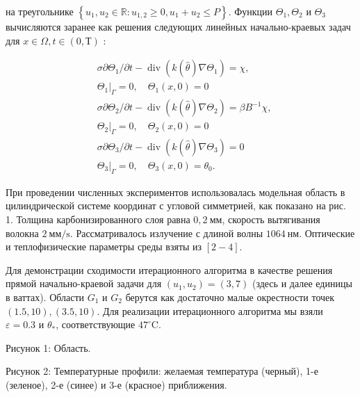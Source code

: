на треугольнике  $\left\{u_{1}, u_{2} \in \mathbb{R}: u_{1,2} \geq 0, u_{1}+u_{2} \leq P\right\}$.
Функции $\Theta_{1}, \Theta_{2}$ и $\Theta_{3}$ вычисляются заранее как решения следующих линейных
начально-краевых задач для $x \in \Omega, t \in(0 , Т)$ :


\[
    \begin{aligned}
        &\sigma \partial \Theta_{1} / \partial t-\operatorname{div}\left(k(\widehat{\theta})
        \nabla \Theta_{1}\right)=\chi, \\
        &\left.\Theta_{1}\right|_{\Gamma}=0, \quad \Theta_{1}(x, 0)=0 \\
        &\sigma \partial \Theta_{2} / \partial t-\operatorname{div}\left(k(\widehat{\theta})
        \nabla \Theta_{2}\right)=\beta B^{-1} \chi, \\
        &\left.\Theta_{2}\right|_{\Gamma}=0, \quad \Theta_{2}(x, 0)=0 \\
        &\sigma \partial \Theta_{3} / \partial t-\operatorname{div}\left(k(\widehat{\theta})
        \nabla \Theta_{3}\right)=0 \\
        &\left.\Theta_{3}\right|_{\Gamma}=0, \quad \Theta_{3}(x, 0)=\theta_{0} .
    \end{aligned}
\]

При проведении численных экспериментов использовалась модельная область в
цилиндрической системе координат с угловой симметрией, как показано на рис. 1.
Толщина карбонизированного слоя равна
$0,2 \mathrm{~мм}$, скорость вытягивания волокна
$2 \mathrm{~мм}/\mathrm{s}$. Рассматривалось излучение с длиной волны
$1064 \mathrm{~нм}$.
Оптические и теплофизические параметры среды взяты из $[2-4]$.


Для демонстрации сходимости итерационного алгоритма в качестве
решения прямой начально-краевой задачи для $\left(u_{1}, u_{2}\right)=( 3,7)$
(здесь и далее единицы в ваттах).
Области $G_{1}$ и $G_{2}$
берутся как достаточно малые окрестности точек $(1.5,10),(3.5,10)$.
Для реализации итерационного алгоритма мы взяли $\varepsilon=0.3$ и $\theta_{*}$,
соответствующие $47^{\circ} \mathrm{C}$.



Рисунок 1: Область.


Рисунок 2: Температурные профили: желаемая температура (черный),
1-е (зеленое), 2-е (синее) и 3-е (красное) приближения.

